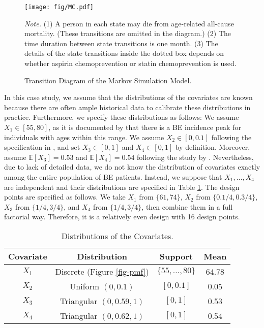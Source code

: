 \documentclass[ijoc,nonblindrev]{informs3}
\def\E{\mathbb{E}}
\begin{document}
\begin{figure}%
\centering
\texttt{[image: fig/MC.pdf]}
\caption{Transition Diagram of the Markov Simulation Model.}  \label{fig-MC}
\begin{minipage}[t]{1\linewidth}
\SingleSpacedXI
\vspace{-1.2em}
\footnotesize{
\emph{Note.} \textsf{
(1) A person in each state may die from age-related all-cause mortality. (These transitions are omitted in the diagram.)
(2) The time duration between state transitions is one month.
(3) The details of the state transitions inside the dotted box depends on whether aspirin chemoprevention or  statin chemoprevention is used.
}
}
\end{minipage}
\end{figure}








In this case study, we assume that the distributions of the covariates are known because there are often ample historical data to calibrate these distributions in practice. Furthermore, we specify these distributions as follows: We assume $X_1\in[55, 80]$, as it is documented by \cite{naef1972} that there is a BE incidence peak for individuals with ages within this range.
We assume  $X_2\in[0,0.1]$ following the specification in \cite{hur2004}, and set $X_3\in[0,1]$ and $X_4\in[0,1]$ by definition.
Moreover, assume $\E[X_3]=0.53$ and $\E[X_4]=0.54$ following the study by \cite{kastelein2011}.
Nevertheless, due to lack of detailed data, we do not know the distribution of covariates exactly among the entire population of BE patients.
Instead, we suppose that $X_1,\ldots,X_4$ are independent and their distributions are specified in Table \ref{tab-dist}.
The design points are specified as follows.
We take $X_1$ from $\{61, 74\}$, $X_2$ from $\{0.1/4, 0.3/4\}$, $X_3$ from $\{1/4, 3/4\}$, and $X_4$ from $\{1/4, 3/4\}$, then combine them in a full factorial way.
Therefore, it is a relatively even design with 16 design points.





\begin{table}%
\caption{Distributions of the Covariates.} \label{tab-dist}
\centering
\small
\begin{tabular}{cccc}
        \toprule
        Covariate   & Distribution & Support & Mean \\
        \midrule
        $X_1$ & \textsf{Discrete} (Figure \ref{fig-pmf}) & $\{55,\ldots,80\}$ & 64.78\\
        $X_2$ & \textsf{Uniform} $(0,0.1)$ & $[0,0.1]$ & 0.05\\
        $X_3$ & \textsf{Triangular} $(0,0.59,1)$ & $[0,1]$ & 0.53\\
        $X_4$ & \textsf{Triangular} $(0,0.62,1)$ & $[0,1]$ & 0.54\\
        \bottomrule
\end{tabular}
\end{table}
\end{document}
